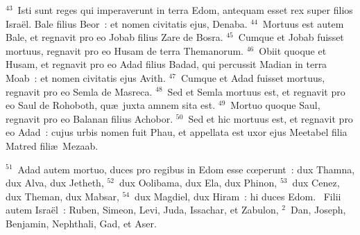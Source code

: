 ${}^{43}$~Isti sunt reges qui imperaverunt in terra Edom, antequam esset rex super filios Isra\"el. Bale filius Beor~: et nomen civitatis ejus, Denaba.
${}^{44}$~Mortuus est autem Bale, et regnavit pro eo Jobab filius Zare de Bosra.
${}^{45}$~Cumque et Jobab fuisset mortuus, regnavit pro eo Husam de terra Themanorum.
${}^{46}$~Obiit quoque et Husam, et regnavit pro eo Adad filius Badad, qui percussit Madian in terra Moab~: et nomen civitatis ejus Avith.
${}^{47}$~Cumque et Adad fuisset mortuus, regnavit pro eo Semla de Masreca.
${}^{48}$~Sed et Semla mortuus est, et regnavit pro eo Saul de Rohoboth, qu\ae\ juxta amnem sita est.
${}^{49}$~Mortuo quoque Saul, regnavit pro eo Balanan filius Achobor.
${}^{50}$~Sed et hic mortuus est, et regnavit pro eo Adad~: cujus urbis nomen fuit Phau, et appellata est uxor ejus Meetabel filia Matred fili\ae\ Mezaab.


${}^{51}$~Adad autem mortuo, duces pro regibus in Edom esse cœperunt~: dux Thamna, dux Alva, dux Jetheth,
${}^{52}$~dux Oolibama, dux Ela, dux Phinon,
${}^{53}$~dux Cenez, dux Theman, dux Mabsar,
${}^{54}$~dux Magdiel, dux Hiram~: hi duces Edom.
~\lettrine[lines=10,image=true,loversize=0.05,lraise=-0.03]{F}{}ilii autem Isra\"el~: Ruben, Simeon, Levi, Juda, Issachar, et Zabulon,
${}^{2}$~Dan, Joseph, Benjamin, Nephthali, Gad, et Aser.


